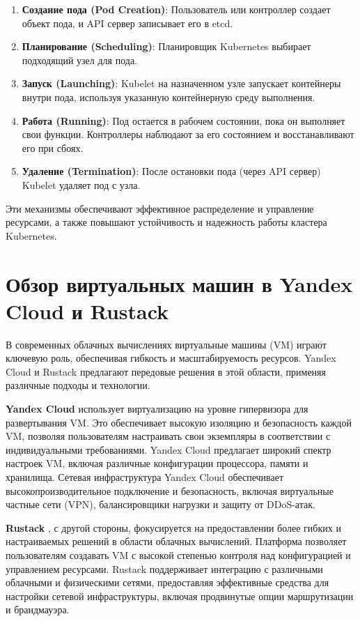\begin{enumerate}
   \item \textbf{Создание пода (Pod Creation)}: Пользователь или контроллер
создает объект пода, и API сервер записывает его в etcd.
   \item \textbf{Планирование (Scheduling)}: Планировщик Kubernetes выбирает
подходящий узел для пода.
   \item \textbf{Запуск (Launching)}: Kubelet на назначенном узле запускает
контейнеры внутри пода, используя указанную контейнерную среду выполнения.
   \item \textbf{Работа (Running)}: Под остается в рабочем состоянии, пока он
выполняет свои функции. Контроллеры наблюдают за его состоянием и
восстанавливают его при сбоях.
   \item \textbf{Удаление (Termination)}: После остановки пода (через API
сервер) Kubelet удаляет под с узла.
\end{enumerate}

Эти механизмы обеспечивают эффективное распределение и управление ресурсами, а
также повышают устойчивость и надежность работы кластера Kubernetes.

\section*{Обзор виртуальных машин в Yandex Cloud и Rustack}

В современных облачных вычислениях виртуальные машины (VM) играют ключевую роль,
обеспечивая гибкость и масштабируемость ресурсов. Yandex Cloud и Rustack
предлагают передовые решения в этой области, применяя различные подходы и
технологии.

\textbf{Yandex Cloud} \cite{yandexcloud} использует виртуализацию на уровне
гипервизора для
развертывания VM. Это обеспечивает высокую изоляцию и безопасность каждой VM,
позволяя пользователям настраивать свои экземпляры в соответствии с
индивидуальными требованиями. Yandex Cloud предлагает широкий спектр настроек
VM, включая различные конфигурации процессора, памяти и хранилища. Сетевая
инфраструктура Yandex Cloud обеспечивает высокопроизводительное подключение и
безопасность, включая виртуальные частные сети (VPN), балансировщики нагрузки и
защиту от DDoS-атак.

\textbf{Rustack} \cite{rustack}, с другой стороны, фокусируется на предоставлении
более гибких
и настраиваемых решений в области облачных вычислений. Платформа позволяет
пользователям создавать VM с высокой степенью контроля над конфигурацией и
управлением ресурсами. Rustack поддерживает интеграцию с различными облачными и
физическими сетями, предоставляя эффективные средства для настройки сетевой
инфраструктуры, включая продвинутые опции маршрутизации и брандмауэра.

